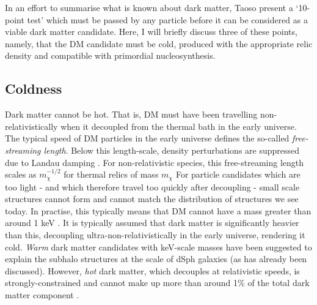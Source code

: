 In an effort to summarise what is known about dark matter, Taoso \etal \cite{Taoso:2008} present a `10-point test' which must be passed by any particle before it can be considered as a viable dark matter candidate. Here, I will briefly discuss three of these points, namely, that the DM candidate must be cold, produced with the appropriate relic density and compatible with primordial nucleosynthesis.

\subsection{Coldness}

Dark matter cannot be hot. That is, DM must have been travelling non-relativistically when it decoupled from the thermal bath in the early universe. The typical speed of DM particles in the early universe defines the so-called \textit{free-streaming length}. Below this length-scale, density perturbations are suppressed due to Landau damping \cite{Bond:1983}. For non-relativistic species, this free-streaming length scales as $m_\chi^{-1/2}$ for thermal relics of mass $m_\chi$ \cite{Boyanovsky:2008} For particle candidates which are too light - and which therefore travel too quickly after decoupling - small scale structures cannot form and cannot match the distribution of structures we see today. In practise, this typically means that DM cannot have a mass greater than around 1 keV \cite{Narayanan:2000}. It is typically assumed that dark matter is significantly heavier than this, decoupling ultra-non-relativistically in the early universe, rendering it cold.  \textit{Warm} dark matter candidates with keV-scale masses have been suggested to explain the subhalo structures at the scale of dSph galaxies (as has already been discussed). However, \textit{hot} dark matter, which decouples at relativistic speeds, is strongly-constrained and cannot make up more than around 1\% of the total dark matter component \cite{Abazajian:2005, dePutter:2012}.


